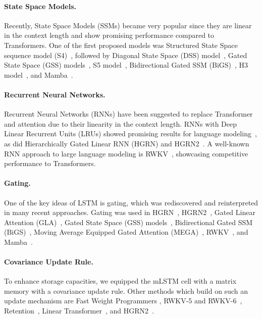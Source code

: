 \documentclass[dvipsnames]{article}
\begin{document}
\paragraph{State Space Models.}
Recently, State Space Models (SSMs) became very popular since they
are linear in the context length and show promising performance compared
to Transformers.
One of the first proposed models was
Structured State Space sequence model (S4)~\citep{Gu:21}, followed by
Diagonal State Space (DSS) model~\citep{Gupta:22},
Gated State Space (GSS) models~\citep{Mehta:22},
S5 model~\citep{Smith:22},
Bidirectional Gated SSM (BiGS)~\citep{Wang:22},
H3 model~\citep{Fu:23},
and Mamba~\citep{Gu:24arxiv}.
\paragraph{Recurrent Neural Networks.}
Recurrent Neural Networks (RNNs) have been suggested to
replace Transformer and attention due to their linearity
in the context length.
RNNs with Deep Linear Recurrent Units (LRUs) showed
promising results for language modeling~\citep{Orvieto:23, De:24arxiv},
as did Hierarchically Gated Linear RNN (HGRN)
\citep{Qin:23} and HGRN2~\citep{Qin:24arxiv}.
A well-known RNN approach to large language modeling
is RWKV~\citep{Peng:23arxivshort,Peng:24arxivshort},
showcasing competitive performance to Transformers.
\paragraph{Gating.}
One of the key ideas of LSTM is gating, which
was rediscovered and reinterpreted in many recent approaches.
Gating was used in HGRN~\citep{Qin:23},
HGRN2~\citep{Qin:24arxiv}, Gated Linear Attention (GLA)~\citep{Yang:23arxiv},
Gated State Space (GSS) models~\citep{Mehta:22},
Bidirectional Gated SSM (BiGS)~\citep{Wang:22},
Moving Average Equipped Gated Attention (MEGA)~\citep{Ma:22},
RWKV~\citep{Peng:23arxivshort},
and Mamba~\citep{Gu:24arxiv}.
\paragraph{Covariance Update Rule.}
To enhance storage capacities, we equipped the mLSTM cell
with a matrix memory with a covariance update rule.
Other methods which build on such an update mechanism are
Fast Weight Programmers
\citep{Schmidhuber:92ncfastweights,Schlag:21},
RWKV-5 and RWKV-6~\citep{Peng:24arxivshort},
Retention~\citep{Sun:23arxiv},
Linear Transformer~\citep{Katharopoulos:20},
and HGRN2~\citep{Qin:24arxiv}.
\end{document}
